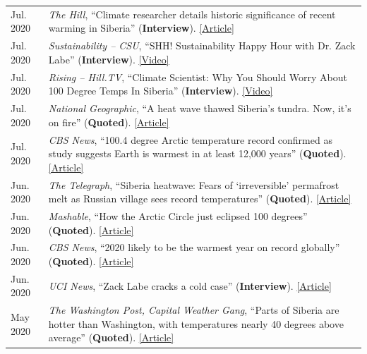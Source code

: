 \documentclass[margin,line,palatino,courier,10pt]{res}
\begin{document}
\begin{resume}
\begin{tabular}{@{}p{0.9in}p{4in}}
Jul. 2020 & \textit{The Hill}, ``Climate researcher details historic significance of recent warming in Siberia'' (\textbf{Interview}). \href{https://thehill.com/hilltv/rising/507850-climate-researcher-details-historic-significance-of-recent-warming-in-siberia}{[Article]}\\
Jul. 2020 & \textit{Sustainability -- CSU}, ``SHH! Sustainability Happy Hour with Dr. Zack Labe'' (\textbf{Interview}). \href{https://www.youtube.com/watch?v=E6htTPoeXQ8&feature=youtu.be}{[Video]}\\
Jul. 2020 & \textit{Rising -- Hill.TV}, ``Climate Scientist: Why You Should Worry About 100 Degree Temps In Siberia'' (\textbf{Interview}). \href{https://www.youtube.com/watch?v=fw4fG-_aI28&feature=youtu.be}{[Video]}\\
Jul. 2020 & \textit{National Geographic}, ``A heat wave thawed Siberia’s tundra. Now, it’s on fire'' (\textbf{Quoted}). \href{https://www.nationalgeographic.com/science/2020/07/heat-wave-thawed-siberia-now-on-fire/#close}{[Article]}\\
Jul. 2020 & \textit{CBS News}, ``100.4 degree Arctic temperature record confirmed as study suggests Earth is warmest in at least 12,000 years'' (\textbf{Quoted}). \href{https://www.cbsnews.com/news/arctic-temperature-record-100-4-degrees-earth-warmest-12000-years/}{[Article]}\\
Jun. 2020 & \textit{The Telegraph}, ``Siberia heatwave: Fears of `irreversible' permafrost melt as Russian village sees record temperatures'' (\textbf{Quoted}). \href{https://www.telegraph.co.uk/news/2020/06/26/siberia-heatwave-fears-irreversible-permafrost-meltas-russian/}{[Article]}\\
Jun. 2020 & \textit{Mashable}, ``How the Arctic Circle just eclipsed 100 degrees'' (\textbf{Quoted}). \href{https://mashable.com/article/arctic-heat-100-degrees/}{[Article]}\\
Jun. 2020 & \textit{CBS News}, ``2020 likely to be the warmest year on record globally'' (\textbf{Quoted}). \href{https://www.cbsnews.com/news/warmest-year-on-record-2020-likely/}{[Article]}\\
Jun. 2020 & \textit{UCI News}, ``Zack Labe cracks a cold case'' (\textbf{Interview}). \href{https://medium.com/@UCISoPS/zack-labe-cracks-a-cold-case-6e8793248e9d}{[Article]}\\
May 2020 & \textit{The Washington Post, Capital Weather Gang}, ``Parts of Siberia are hotter than Washington, with temperatures nearly 40 degrees above average'' (\textbf{Quoted}). \href{https://www.washingtonpost.com/weather/2020/05/22/siberia-heat-wave/}{[Article]}\\

\end{tabular}
\end{resume}
\end{document}
